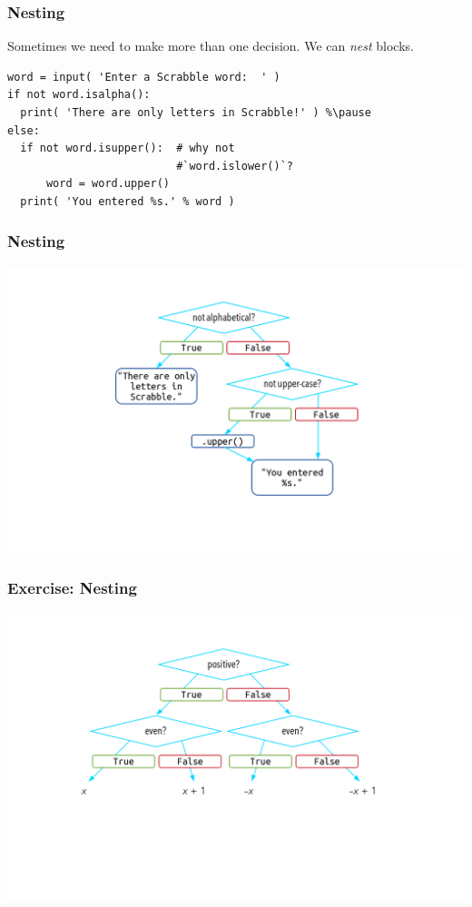 \documentclass[11pt]{beamer}
\begin{document}
\begin{frame}[fragile]
  \frametitle{Nesting}
  \Enlarge

  \begin{itemize}
  \myitem  Sometimes we need to make more than one decision. %
  \myitem  We can \emph{nest} blocks. %
    \begin{Verbatim}
word = input( 'Enter a Scrabble word:  ' )
if not word.isalpha():
  print( 'There are only letters in Scrabble!' ) %\pause
else:
  if not word.isupper():  # why not
                          #`word.islower()`?
      word = word.upper()
  print( 'You entered %s.' % word )
    \end{Verbatim}
  \end{itemize}
\end{frame}

\begin{frame}
  \frametitle{Nesting}
  \includegraphics[width=\textwidth]{./img/control-flow-nesting-else.png}
\end{frame}

\begin{frame}
  \frametitle{Exercise:  Nesting}
  \includegraphics[width=\textwidth]{./img/control-flow-nesting-else-ex.png}
\end{frame}
\end{document}
